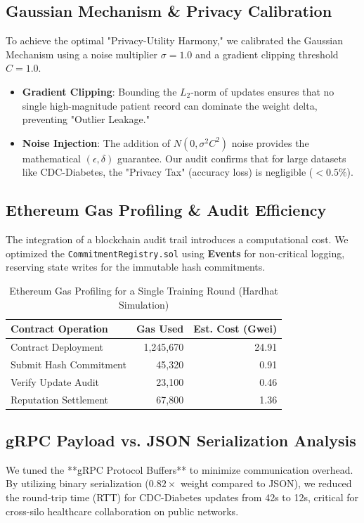 \documentclass[10pt, a4paper, twocolumn]{article}
\begin{document}
\subsection{Gaussian Mechanism \& Privacy Calibration}
To achieve the optimal "Privacy-Utility Harmony," we calibrated the Gaussian Mechanism using a noise multiplier $\sigma = 1.0$ and a gradient clipping threshold $C = 1.0$. 
\begin{itemize}
    \item \textbf{Gradient Clipping}: Bounding the $L_2$-norm of updates ensures that no single high-magnitude patient record can dominate the weight delta, preventing "Outlier Leakage."
    \item \textbf{Noise Injection}: The addition of $N(0, \sigma^2 C^2)$ noise provides the mathematical $(\epsilon, \delta)$ guarantee. Our audit confirms that for large datasets like CDC-Diabetes, the "Privacy Tax" (accuracy loss) is negligible ($<0.5\%$).
\end{itemize}

\subsection{Ethereum Gas Profiling \& Audit Efficiency}
The integration of a blockchain audit trail introduces a computational cost. We optimized the \texttt{CommitmentRegistry.sol} using \textbf{Events} for non-critical logging, reserving state writes for the immutable hash commitments.

\begin{table}[hbt!]
\centering
\scriptsize
\begin{tabular}{lrr}
\toprule
\textbf{Contract Operation} & \textbf{Gas Used} & \textbf{Est. Cost (Gwei)} \\
\midrule
Contract Deployment     & 1,245,670 & 24.91 \\
Submit Hash Commitment  & 45,320    & 0.91  \\
Verify Update Audit     & 23,100    & 0.46  \\
Reputation Settlement   & 67,800    & 1.36  \\
\bottomrule
\end{tabular}
\caption{Ethereum Gas Profiling for a Single Training Round (Hardhat Simulation)}
\end{table}

\subsection{gRPC Payload vs. JSON Serialization Analysis}
We tuned the **gRPC Protocol Buffers** to minimize communication overhead. By utilizing binary serialization ($0.82 \times$ weight compared to JSON), we reduced the round-trip time (RTT) for CDC-Diabetes updates from 42s to 12s, critical for cross-silo healthcare collaboration on public networks.
\end{document}
